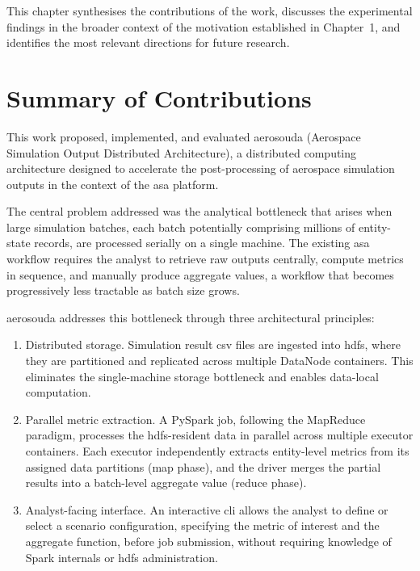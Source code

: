 
This chapter synthesises the contributions of the work, discusses the experimental
findings in the broader context of the motivation established in Chapter~1, and
identifies the most relevant directions for future research.

\section{Summary of Contributions}
\label{sec:conc-summary}

This work proposed, implemented, and evaluated \gls{aerosouda} (Aerospace Simulation
Output Distributed Architecture), a distributed computing architecture designed to
accelerate the post-processing of aerospace simulation outputs in the context of the \gls{asa}
platform.

The central problem addressed was the analytical bottleneck that arises when large
simulation batches, each batch potentially comprising millions of entity-state records, are
processed serially on a single machine.  The existing \gls{asa} workflow requires the analyst to
retrieve raw outputs centrally, compute metrics in sequence, and manually produce aggregate
values, a workflow that becomes progressively less tractable as batch size grows.

\gls{aerosouda} addresses this bottleneck through three architectural principles:

\begin{enumerate}
    \item Distributed storage.  Simulation result \gls{csv} files are ingested into
          \gls{hdfs}, where they are partitioned and replicated across multiple DataNode
          containers.  This eliminates the single-machine storage bottleneck and enables
          data-local computation.

    \item Parallel metric extraction.  A PySpark job, following the MapReduce
          paradigm, processes the \gls{hdfs}-resident data in parallel across multiple executor
          containers.  Each executor independently extracts entity-level metrics from its
          assigned data partitions (map phase), and the driver merges the partial results into
          a batch-level aggregate value (reduce phase).

    \item Analyst-facing interface.  An interactive \gls{cli} allows the analyst to
          define or select a scenario configuration, specifying the metric of interest and
          the aggregate function, before job submission, without requiring knowledge of
          Spark internals or \gls{hdfs} administration.
\end{enumerate}

